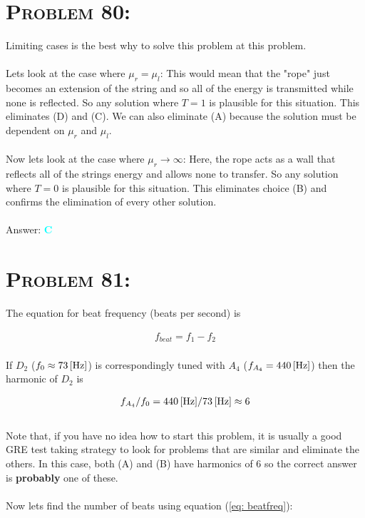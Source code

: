 \documentclass{article}
\begin{document}
\section{\textsc{Problem 80:}} Limiting cases is the best why to solve this problem at this problem. \\\\
Lets look at the case where $\mu_{r} = \mu_{l}$: This would mean that the "rope" just becomes an extension of the string and so all of the energy is transmitted while none is reflected. So any solution where $T = 1$ is plausible for this situation. This eliminates (D) and (C). We can also eliminate (A) because the solution must be dependent on $\mu_{r}$ and $\mu_{l}$. \\
\\
Now lets look at the case where $\mu_{r} \rightarrow \infty$: Here, the rope acts as a wall that reflects all of the strings energy and allows none to transfer. So any solution where $T = 0$ is plausible for this situation. This eliminates choice (B) and confirms the elimination of every other solution. 
\\\\
Answer: \textbf{\textcolor{cyan}C}\\


\section{\textsc{Problem 81:}} The equation for beat frequency (beats per second) is 

\begin{gather}
\label {eq: beatfreq} f_{beat} = f_{1} - f_{2}
\end{gather}
\\
If $D_{2}$ ($f_{0} \approx \unit[73]{[Hz]}$) is correspondingly tuned with $A_{4}$ ($f_{A_{4}}= \unit[440]{[Hz]}$) then the harmonic of $D_{2}$ is 

\begin{gather}
f_{A_{4}}/f_{0} = \unit[440]{[Hz]}/  \unit[73]{[Hz]} \approx 6\nonumber
\end{gather}
\\
Note that, if you have no idea how to start this problem, it is usually a good GRE test taking strategy to look for problems that are similar and eliminate the others. In this case, both (A) and (B) have harmonics of 6 so the correct answer is \textbf{probably} one of these.\\
\\
Now lets find the number of beats using equation (\ref{eq: beatfreq}):
\end{document}
